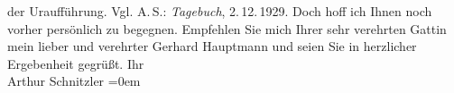 \begin{ledgroupsized}[t]{13cm}
{{{                  der Uraufführung. Vgl. A. S.: \emph{Tagebuch}, 2. 12. 1929}}}\label{K_L02526_2h}. Doch hoff ich Ihnen noch vorher persönlich zu begegnen.\pend
           \pstart
           Empfehlen Sie mich Ihrer sehr verehrten Gattin mein lieber und verehrter Gerhard
               Hauptmann und seien Sie in herzlicher Ergebenheit gegrüßt.\pend
           \pstart
           Ihr{\\[\baselineskip]}Arthur Schnitzler\pend
           \leftskip=0em{}
         
         \endnumbering{}\end{ledgroupsized}  \newcommand{\dateiname}{L02526}\newcommand{\titel}{Arthur Schnitzler an Gerhart Hauptmann, 27. 11. 1929}\newcommand{\editorInnen}{ Martin Anton Müller und Gerd-Hermann Susen}
      